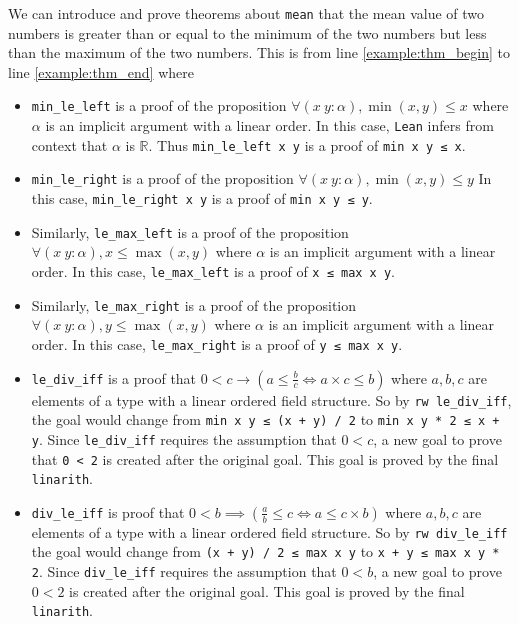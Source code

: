 \documentclass{report}
\theoremstyle{definition}
\begin{document}
We can introduce and prove theorems about {\tt \small mean} that the mean value of two numbers is greater than or equal to the minimum of the two numbers but less than the maximum of the two numbers. This is from line \ref{example:thm_begin} to line \ref{example:thm_end} where
\begin{itemize}
  \item {\tt \small min\_le\_left} is a proof of the proposition $\forall (x\ y : \alpha), \min(x, y) \le x$ where $\alpha$ is an implicit argument with a linear order. In this case, {\tt \small Lean} infers from context that $\alpha$ is $\mathbb R$. Thus {\tt \small min\_le\_left x y} is a proof of {\tt \small min x y ≤ x}.
  \item {\tt \small min\_le\_right} is a proof of the proposition $\forall (x\ y : \alpha), \min(x, y) \le y$ In this case, {\tt \small min\_le\_right x y} is a proof of {\tt \small min x y ≤ y}.
  \item Similarly, {\tt \small le\_max\_left} is a proof of the proposition $\forall (x\ y : \alpha), x \le \max(x, y)$ where $\alpha$ is an implicit argument with a linear order. In this case, {\tt \small le\_max\_left} is a proof of {\tt \small x ≤ max x y}.
  \item Similarly, {\tt \small le\_max\_right} is a proof of the proposition $\forall (x\ y : \alpha), y \le \max(x, y)$ where $\alpha$ is an implicit argument with a linear order. In this case, {\tt \small le\_max\_right} is a proof of {\tt \small y ≤ max x y}.
  \item {\tt \small le\_div\_iff} is a proof that $0 < c \to (a \le \frac{b}{c} \iff a\times c \le b)$ where $a,b,c$ are elements of a type with a linear ordered field structure. So by {\tt \small rw le\_div\_iff}, the goal would change from {\tt \small min x y ≤ (x + y) / 2} to {\tt \small min x y * 2 ≤ x + y}. Since {\tt \small le\_div\_iff} requires the assumption that $0<c$, a new goal to prove that {\tt \small 0 < 2} is created after the original goal. This goal is proved by the final {\tt \small linarith}.
  \item {\tt \small div\_le\_iff} is proof that $0 < b \implies (\frac a b \le c \iff a \le c \times b)$ where $a,b,c$ are elements of a type with a linear ordered field structure. So by {\tt \small rw div\_le\_iff} the goal would change from {\tt \small (x + y) / 2 ≤ max x y} to {\tt \small x + y ≤ max x y * 2}. Since {\tt \small div\_le\_iff} requires the assumption that $0 < b$, a new goal to prove $0 < 2$ is created after the original goal. This goal is proved by the final {\tt \small linarith}.

\end{itemize}
\end{document}
